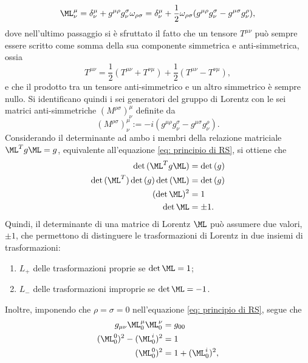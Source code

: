 \begin{equation}
    \ML^\mu_\nu = \delta^\mu_\nu + g^{\mu\rho}g^\sigma_\nu\omega_{\rho\sigma} = \delta^\mu_\nu + \frac{1}{2}\omega_{\rho\sigma}(g^{\mu\rho}g^\sigma_\nu-g^{\mu\sigma}g^\rho_\nu),
\end{equation}
dove nell'ultimo passaggio si è sfruttato il fatto che un tensore $T^{\mu\nu}$ può sempre essere scritto come somma della sua componente simmetrica e anti-simmetrica, ossia
\begin{equation}
    T^{\mu\nu} = \frac{1}{2}(T^{\mu\nu} + T^{\nu\mu}) + \frac{1}{2}(T^{\mu\nu} - T^{\nu\mu}),
\end{equation}
e che il prodotto tra un tensore anti-simmetrico e un altro simmetrico è sempre nullo. Si identificano quindi i sei generatori del gruppo di Lorentz con le sei matrici anti-simmetriche $(M^{\rho\sigma})^\mu_\nu$ definite da
\begin{equation}
\label{eq: generatori gruppo di Lorentz}
    (M^{\rho\sigma})^\mu_\nu := -i(g^{\mu\rho}g^\sigma_\nu-g^{\mu\sigma}g^\rho_\nu).
\end{equation}
Considerando il determinante ad ambo i membri della relazione matriciale $\ML^Tg\ML = g$, equivalente all'equazione \eqref{eq: principio di RS}, si ottiene che
\begin{equation}
    \begin{split}
        \det{(\ML^Tg\ML)} &= \det{(g)} \\
        \det{(\ML^T)}\det{(g)}\det{(\ML)} &= \det{(g)} \\
        (\det{\ML})^2 &= 1 \\
        \det{\ML} &= \pm 1.
    \end{split}
\end{equation}
Quindi, il determinante di una matrice di Lorentz $\ML$ può assumere due valori, $\pm1$, che permettono di distinguere le trasformazioni di Lorentz in due insiemi di trasformazioni:
\begin{enumerate}
    \item $L_+$ delle trasformazioni proprie se $\det{\ML} = 1$;
    \item $L_-$ delle trasformazioni improprie se $\det{\ML} = -1$.
\end{enumerate}
Inoltre, imponendo che $\rho = \sigma = 0$ nell'equazione \eqref{eq: principio di RS}, segue che
\begin{equation}
    \begin{split}
        g_{\mu\nu}\ML^\mu_0\ML^\nu_0 &= g_{00} \\
        (\ML^0_0)^2 - (\ML^i_0)^2 &= 1 \\
        (\ML^0_0)^2 &= 1 + (\ML^i_0)^2,
    \end{split}
\end{equation}
